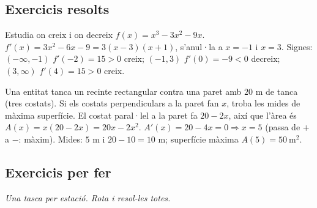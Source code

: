 \subsection{Exercicis resolts}

\begin{exresolt}
Estudia on creix i on decreix $f(x)=x^3-3x^2-9x$.
\solucio
$f'(x)=3x^2-6x-9=3(x-3)(x+1)$, s'anul·la a $x=-1$ i $x=3$. Signes: $(-\infty,-1)$
$f'(-2)=15>0$ creix; $(-1,3)$ $f'(0)=-9<0$ decreix; $(3,\infty)$ $f'(4)=15>0$ creix.
\end{exresolt}

\begin{exresolt}
Una entitat tanca un recinte rectangular contra una paret amb $20$ m de tanca (tres
costats). Si els costats perpendiculars a la paret fan $x$, troba les mides de màxima
superfície.
\solucio
El costat paral·lel a la paret fa $20-2x$, així que l'àrea és $A(x)=x(20-2x)=20x-2x^2$.
$A'(x)=20-4x=0\Rightarrow x=5$ (passa de $+$ a $-$: màxim). Mides: $5$ m i
$20-10=10$ m; superfície màxima $A(5)=50\ \text{m}^2$.
\end{exresolt}

\subsection{Exercicis per fer}

\noindent\textit{Una tasca per estació. Rota i resol-les totes.}

